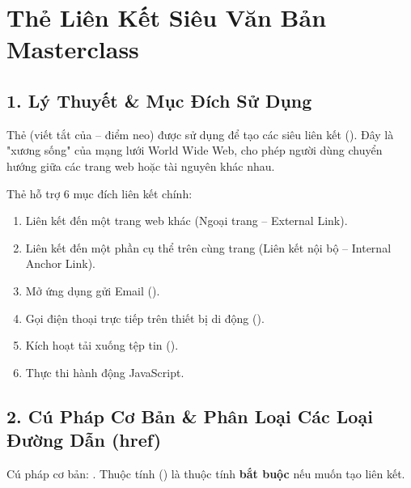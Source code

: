 \section{Thẻ Liên Kết Siêu Văn Bản  Masterclass}
\label{sec:anchor_tag_masterclass}

\subsection{1. Lý Thuyết \& Mục Đích Sử Dụng}
Thẻ  (viết tắt của  -- điểm neo) được sử dụng để tạo các siêu liên kết (). Đây là "xương sống" của mạng lưới World Wide Web, cho phép người dùng chuyển hướng giữa các trang web hoặc tài nguyên khác nhau.

Thẻ  hỗ trợ 6 mục đích liên kết chính:
\begin{enumerate}
    \item Liên kết đến một trang web khác (Ngoại trang -- External Link).
    \item Liên kết đến một phần cụ thể trên cùng trang (Liên kết nội bộ -- Internal Anchor Link).
    \item Mở ứng dụng gửi Email ().
    \item Gọi điện thoại trực tiếp trên thiết bị di động ().
    \item Kích hoạt tải xuống tệp tin ().
    \item Thực thi hành động JavaScript.
\end{enumerate}

\subsection{2. Cú Pháp Cơ Bản \& Phân Loại Các Loại Đường Dẫn (href)}
Cú pháp cơ bản: . Thuộc tính  () là thuộc tính \textbf{bắt buộc} nếu muốn tạo liên kết.

